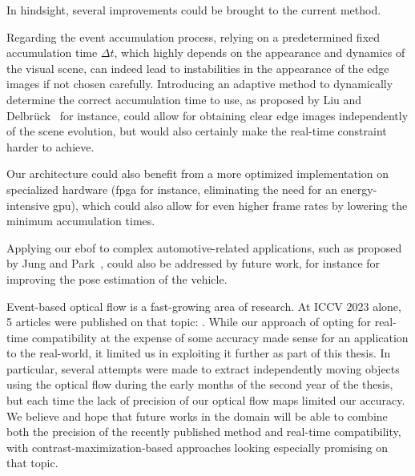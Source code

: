 In hindsight, several improvements could be brought to the current method.
\begin{enumerate*}[label=\textbf{(\arabic*)}]
  \item Regarding the event accumulation process, relying on a predetermined fixed accumulation time \(\Delta t\), which highly depends on the appearance and dynamics of the visual scene, can indeed lead to instabilities in the appearance of the edge images if not chosen carefully. Introducing an adaptive method to dynamically determine the correct accumulation time to use, as proposed by Liu and Delbrück~\cite{Liu2018AdaptiveTB} for instance, could allow for obtaining clear edge images independently of the scene evolution, but would also certainly make the real-time constraint harder to achieve.
  \item Our architecture could also benefit from a more optimized implementation on specialized hardware (\acrshort{fpga} for instance, eliminating the need for an energy-intensive \acrshort{gpu}), which could also allow for even higher frame rates by lowering the minimum accumulation times. 
  \item Applying our \acrshort{ebof} to complex automotive-related applications, such as proposed by Jung and Park~\cite{Jung2020ConstrainedFF}, could also be addressed by future work, for instance for improving the pose estimation of the vehicle.
\end{enumerate*}

Event-based optical flow is a fast-growing area of research. At ICCV 2023 alone, 5 articles were published on that topic: \cite{Liu2023TMATM,ParedesValls2023TamingCM,Luo2023LearningOF,Ponghiran2023EventbasedTD,Wan2023RPEFlowMF}. While our approach of opting for real-time compatibility at the expense of some accuracy made sense for an application to the real-world, it limited us in exploiting it further as part of this thesis. In particular, several attempts were made to extract independently moving objects using the optical flow during the early months of the second year of the thesis, but each time the lack of precision of our optical flow maps limited our accuracy. We believe and hope that future works in the domain will be able to combine both the precision of the recently published method and real-time compatibility, with contrast-maximization-based approaches looking especially promising on that topic.

